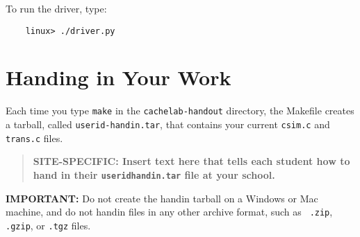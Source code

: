 \documentclass[11pt]{article}
\begin{document}
To run the driver, type:
\begin{verbatim}
    linux> ./driver.py
\end{verbatim}


\section{Handing in Your Work}
Each time you type {\tt make} in the \verb:cachelab-handout: directory,
  the Makefile creates a tarball, called {\tt userid-handin.tar},
  that contains your current {\tt csim.c} and {\tt trans.c} files.

\begin{quote}
{\bf SITE-SPECIFIC: Insert text here that tells each student how to
hand in their {\tt  userid\-handin.tar} file at your school.}
\end{quote}

{\bf IMPORTANT:} Do not create the handin tarball on a Windows or Mac machine,
and do not handin files in any other archive format, such as {\tt
  .zip}, {\tt .gzip}, or {\tt .tgz} files.
\end{document}
